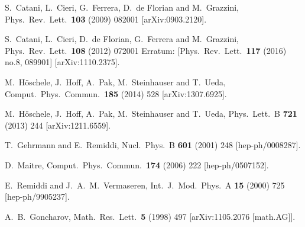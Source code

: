 \documentclass[12pt]{article}
\begin{document}
\begin{thebibliography}{99}
  
  
  
  S.~Catani, L.~Cieri, G.~Ferrera, D.~de Florian and M.~Grazzini,
  Phys.\ Rev.\ Lett.\  {\bf 103} (2009) 082001
  [arXiv:0903.2120].

  S.~Catani, L.~Cieri, D.~de Florian, G.~Ferrera and M.~Grazzini,
  Phys.\ Rev.\ Lett.\  {\bf 108} (2012) 072001
   Erratum: [Phys.\ Rev.\ Lett.\  {\bf 117} (2016) no.8,  089901]
  [arXiv:1110.2375].





  M.~H\"oschele, J.~Hoff, A.~Pak, M.~Steinhauser and T.~Ueda,
  Comput.\ Phys.\ Commun.\  {\bf 185} (2014) 528
  [arXiv:1307.6925].
  
  M.~H\"oschele, J.~Hoff, A.~Pak, M.~Steinhauser and T.~Ueda,
  Phys.\ Lett.\ B {\bf 721} (2013) 244
  [arXiv:1211.6559].
  
  T.~Gehrmann and E.~Remiddi,
  Nucl.\ Phys.\ B {\bf 601} (2001) 248
   [hep-ph/0008287].

  
  D.~Maitre,
  Comput.\ Phys.\ Commun.\  {\bf 174} (2006) 222
   [hep-ph/0507152].
  
  E.~Remiddi and J.~A.~M.~Vermaseren,
  Int.\ J.\ Mod.\ Phys.\ A {\bf 15} (2000) 725
   [hep-ph/9905237].
  
  A.~B.~Goncharov,
  Math.\ Res.\ Lett.\  {\bf 5} (1998) 497
   [arXiv:1105.2076 [math.AG]].
  

\end{thebibliography}
\end{document}
